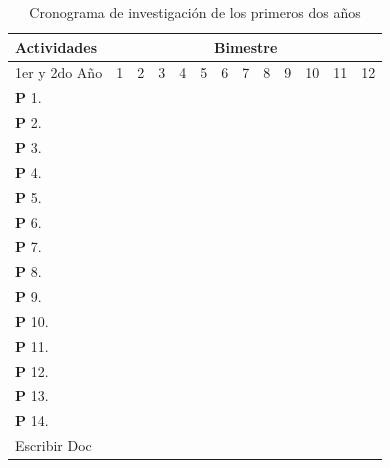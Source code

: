 \begin{table}[!htb]
  \centering
  \newcommand{\Bk}{\multicolumn{1}{G}{ }}
  \begin{tabular}{|p{3.0cm}||c|c|c|c|c|c|c|c|c|c|c|c|}\hline
    Actividades&\multicolumn{12}{|c|}{Bimestre}\\\hline\hline
    1er y  2do A\~no&1&2 &3  &4  &5  &6  &7  &8  &9  &10 &11 &12 \\\hline
    \textbf{P} 1. &\Bk&   &   &   &   &\Bk&   &   &   &\Bk&   &   \\\hline
    \textbf{P} 2. &\Bk&\Bk&   &   &\Bk&\Bk&   &\Bk&\Bk&\Bk&\Bk&\Bk\\\hline
    \textbf{P} 3. &   &\Bk&   &   &\Bk&\Bk&   &\Bk&\Bk&\Bk&\Bk&\Bk\\\hline
    \textbf{P} 4. &   &\Bk&   &   &   &\Bk&\Bk&\Bk&\Bk&\Bk&\Bk&\Bk\\\hline
    \textbf{P} 5. &\Bk&   &   &\Bk&   &\Bk&   &   &   &\Bk&   &   \\\hline
    \textbf{P} 6. &\Bk&   &   &\Bk&   &\Bk&   &   &   &\Bk&   &   \\\hline
    \textbf{P} 7. &   &   &\Bk&\Bk&\Bk&   &\Bk&\Bk&\Bk&   &\Bk&\Bk\\\hline
    \textbf{P} 8. &   &\Bk&   &\Bk&   &\Bk&   &   &   &\Bk&   &   \\\hline
    \textbf{P} 9. &   &   &   &\Bk&   &   &\Bk&\Bk&\Bk&   &\Bk&\Bk\\\hline
    \textbf{P} 10.&   &   &\Bk&\Bk&\Bk&   &\Bk&\Bk&\Bk&   &\Bk&\Bk\\\hline
    \textbf{P} 11.&   &   &\Bk&\Bk&\Bk&   &\Bk&\Bk&\Bk&   &\Bk&\Bk\\\hline
    \textbf{P} 12.&   &   &   &   &\Bk&   &   &\Bk&\Bk&   &\Bk&\Bk\\\hline
    \textbf{P} 13.&   &   &   &   &   &   &   &   &   &   &   &   \\\hline
    \textbf{P} 14.&   &   &   &   &   &   &   &   &   &   &   &   \\\hline
    Escribir Doc &   &\Bk&   &\Bk&   &\Bk&   &\Bk&   &\Bk&   &\Bk\\\hline    
  \end{tabular}
  \caption{Cronograma de investigaci\'on de los primeros dos a\~nos}
  \label{tab:crono}
\end{table}
